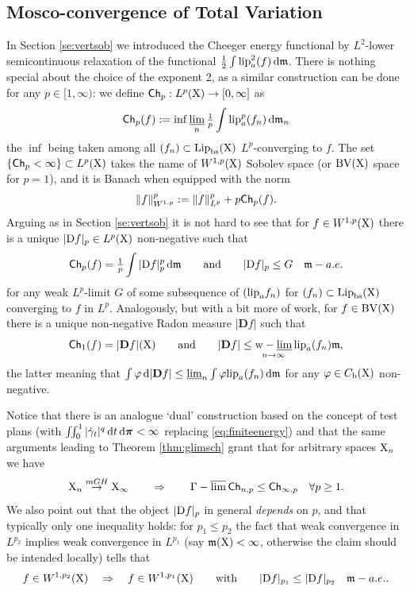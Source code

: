 \documentclass[11pt]{article}
\numberwithin{equation}{section}
\newcommand{\ppi}{{\mbox{\boldmath$\pi$}}}
\newcommand{\X}{{\rm X}}
\newcommand{\mm}{{\mathfrak m}}
\newcommand{\BV}{{\rm BV}}
\newcommand{\ch}{{\sf Ch}}
\renewcommand{\d}{{\rm d}}
\newcommand{\D}{{\rm D}}
\newcommand{\Lip}{{\rm Lip}}
\newcommand{\lipa}{{\rm lip}_a}
\newcommand{\lims}{\varlimsup}
\newcommand{\limi}{\varliminf}
\newcommand{\bs}{{\rm bs}}
\renewcommand{\b}{{\rm b}}
\newcommand{\DD}{\mathbf D}
\DeclareMathOperator*{\glims}{\Gamma-\lims}
\DeclareMathOperator*{\wlimi}{{\rm w}-\limi}
\begin{document}
\subsection{Mosco-convergence of Total Variation}\label{se:gtv}
In Section \ref{se:vertsob} we introduced the Cheeger energy functional by $L^2$-lower semicontinuous relaxation of the functional $\tfrac12\int \lipa^2(f)\,\d\mm$. There is nothing special about the choice of the exponent 2, as a similar construction can be done for any $p\in[1,\infty)$: we define $\ch_p:L^p(\X)\to[0,\infty]$ as
\[
\ch_p(f):=\inf\limi_n\tfrac1p\int\lipa^p(f_n)\,\d\mm_n 
\]
the $\inf$ being taken among all $(f_n)\subset\Lip_{\bs}(\X)$ $L^p$-converging to $f$. The set $\{\ch_p<\infty\}\subset L^p(\X)$ takes the name of $W^{1,p}(\X)$ Sobolev space (or $\BV(\X)$ space for $p=1$), and it is Banach when equipped with the norm
\[
\|f\|_{W^{1,p}}^p:=\|f\|^p_{L^p}+p\ch_p(f).
\]
Arguing as in Section \ref{se:vertsob} it is not hard to see that for $f\in W^{1,p}(\X)$ there is a unique $|\D f|_p\in L^p(\X)$  non-negative such that 
\[
\ch_p(f)=\tfrac1p\int|\D f|_p^p\,\d\mm\qquad\text{and}\qquad |\D f|_p\leq G\quad\mm-a.e.
\]
for any weak $L^p$-limit $G$ of some subsequence of $(\lipa f_n)$ for $(f_n)\subset\Lip_\bs(\X)$ converging to $f$ in $L^p$. Analogously, but with a bit more of work, for $f\in \BV(\X)$ there is a unique non-negative Radon measure $|\DD f|$ such that 
\[
\ch_1(f)=|\DD f|(\X)\qquad\text{and}\qquad |\DD f|\leq\wlimi_{n\to\infty}\lipa(f_n)\mm,
\]
the latter meaning that $\int\varphi\,\d|\DD f|\leq\limi_n\int\varphi \lipa(f_n)\,\d\mm $ for any $\varphi\in C_\b(\X)$ non-negative.
 
 Notice that there is an analogue `dual' construction based on the concept of test plans (with $\iint_0^1|\dot\gamma_t|^q\,\d t\,\d\ppi<\infty$  replacing \eqref{eq:finiteenergy}) and that the same arguments leading to Theorem \ref{thm:glimsch}  grant that for arbitrary spaces $\X_n$ we have
 \begin{equation}
\label{eq:glimischp}
 \X_n\stackrel{mGH}\to\X_\infty\qquad\Rightarrow\qquad \glims \ch_{n,p}\leq  \ch_{\infty,p}\quad\forall p\geq1.
\end{equation}
 We also point out that the object $|\D f|_p$ in general  \emph{depends} on $p$, and that typically only one inequality holds: for $p_1\leq p_2$ the fact that weak convergence in $L^{p_2}$ implies weak convergence in $L^{p_1}$ (say $\mm(\X)<\infty$, otherwise the claim should be intended locally) tells that
\begin{equation}
\label{eq:ineqp1p2}
f\in W^{1,p_2}(\X)\quad\Rightarrow\quad f\in W^{1,p_1}(\X)\qquad\text{with}\qquad |\D f|_{p_1}\leq |\D f|_{p_2}\quad\mm-a.e..
\end{equation}
\end{document}
